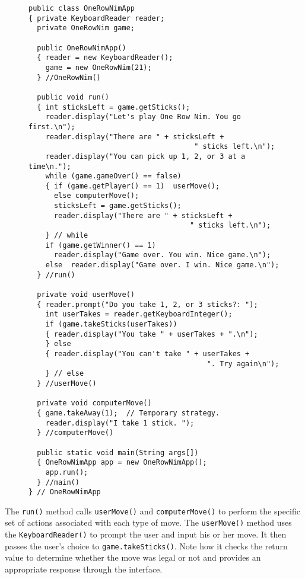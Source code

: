 \begin{figure}[p]
\jjjprogstart
\begin{jjjlisting}[31pc]
\begin{lstlisting}
public class OneRowNimApp 
{ private KeyboardReader reader;
  private OneRowNim game;

  public OneRowNimApp() 
  { reader = new KeyboardReader();
    game = new OneRowNim(21);
  } //OneRowNim()
    
  public void run() 
  { int sticksLeft = game.getSticks();
    reader.display("Let's play One Row Nim. You go first.\n");
    reader.display("There are " + sticksLeft + 
                                       " sticks left.\n");
    reader.display("You can pick up 1, 2, or 3 at a time\n.");
    while (game.gameOver() == false)       
    { if (game.getPlayer() == 1)  userMove();
      else computerMove();
      sticksLeft = game.getSticks();
      reader.display("There are " + sticksLeft + 
                                      " sticks left.\n");
    } // while
    if (game.getWinner() == 1) 
      reader.display("Game over. You win. Nice game.\n");
    else  reader.display("Game over. I win. Nice game.\n");
  } //run()
    
  private void userMove() 
  { reader.prompt("Do you take 1, 2, or 3 sticks?: ");
    int userTakes = reader.getKeyboardInteger();
    if (game.takeSticks(userTakes)) 
    { reader.display("You take " + userTakes + ".\n");
    } else 
    { reader.display("You can't take " + userTakes + 
                                          ". Try again\n");
    } // else
  } //userMove()
    
  private void computerMove() 
  { game.takeAway(1);  // Temporary strategy.
    reader.display("I take 1 stick. ");
  } //computerMove()
    
  public static void main(String args[]) 
  { OneRowNimApp app = new OneRowNimApp();
    app.run();
  } //main()
} // OneRowNimApp
\end{lstlisting}
\end{jjjlisting}
\end{figure}


The {\tt run()} method calls {\tt userMove()} and {\tt computerMove()}
to perform the specific set of actions associated with each type of
move.  The {\tt userMove()} method uses the {\tt KeyboardReader()} to
prompt the user and input his or her move. It then passes the user's
choice to {\tt game.takeSticks()}. Note how it checks the return value
to determine whether the move was legal or not and provides an
appropriate response through the interface.


